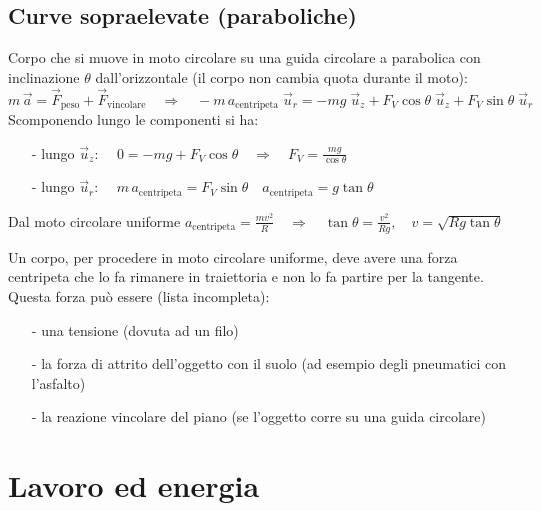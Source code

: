 \documentclass[a4paper]{article}
\newcommand\uz{\vec{u}_z}
\newcommand\ur{\vec{u}_r}
\begin{document}
\subsection{Curve sopraelevate (paraboliche)}
Corpo che si muove in moto circolare su una guida circolare a parabolica con inclinazione \(\theta\) dall'orizzontale (il corpo
non cambia quota durante il moto):
\[m \, \vec{a} = \vec{F}_\text{peso} + \vec{F}_\text{vincolare} \quad \Rightarrow \quad - m \, a_\text{centripeta} \; \ur = - mg \; \uz + F_V \cos \theta \; \uz + F_V \sin \theta \; \ur\]
Scomponendo lungo le componenti si ha:
\begin{itemize}[topsep=3pt, itemsep=0pt]
	\item[-] lungo \(\uz\): \(\displaystyle \quad 0 = - mg + F_V \cos \theta \quad \Rightarrow \quad F_V = \frac{mg}{\cos \theta}\)
	\item[-] lungo \(\ur\): \(\displaystyle \quad m \, a_\text{centripeta} = F_V \sin \theta \quad a_\text{centripeta} = g \tan \theta\)
\end{itemize}
Dal moto circolare uniforme \(\displaystyle a_\text{centripeta} = \frac{m v^2}{R} \quad \Rightarrow \quad \tan \theta = \frac{v^2}{Rg}, \quad v = \sqrt{Rg \tan \theta}\)

Un corpo, per procedere in moto circolare uniforme, deve avere una forza centripeta che lo fa rimanere in traiettoria e non lo fa
partire per la tangente. Questa forza può essere (lista incompleta):
\begin{itemize}[topsep=3pt, itemsep=0pt]
	\item[-] una tensione (dovuta ad un filo)
	\item[-] la forza di attrito dell'oggetto con il suolo (ad esempio degli pneumatici con l'asfalto)
	\item[-] la reazione vincolare del piano (se l'oggetto corre su una guida circolare)
\end{itemize}

\newpage

\section{Lavoro ed energia}
\end{document}
